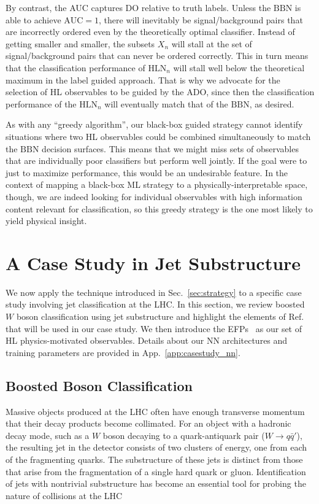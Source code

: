\documentclass[aps,prd,twocolumn,superscriptaddress,preprintnumbers,nofootinbib,longbibliography,floatfix]{revtex4-1}
\newcommand{\BBN}{\text{BBN}}
\newcommand{\HLN}{\text{HLN}}
\newcommand{\AUC}{\text{AUC}}
\newcommand{\rref}[1]{Ref.~\cite{#1}}
\newcommand{\Sec}[1]{Sec.~\ref{#1}}
\newcommand{\App}[1]{App.~\ref{#1}}
\begin{document}
By contrast, the AUC captures DO relative to truth labels. Unless the $\BBN$ is able to achieve $\AUC = 1$, there will inevitably be signal/background pairs that are incorrectly ordered even by the theoretically optimal classifier. Instead of getting smaller and smaller, the subsets $X_{n}$ will stall at the set of signal/background pairs that can never be ordered correctly. This in turn means that the classification performance of $\HLN_{n}$ will stall well below the theoretical maximum in the label guided approach. That is why we advocate for the selection of HL observables to be guided by the ADO, since then the classification performance of the $\HLN_{n}$ will eventually match that of the $\BBN$, as desired.

As with any ``greedy algorithm'', our black-box guided strategy cannot identify situations where two HL observables could be combined simultaneously to match the $\BBN$ decision surfaces. This means that we might miss sets of observables that are individually poor classifiers but perform well jointly. If the goal were to just to maximize performance, this would be an undesirable feature. In the context of mapping a black-box ML strategy to a physically-interpretable space, though, we are indeed looking for individual observables with high information content relevant for classification, so this greedy strategy is the one most likely to yield physical insight. 

\section{A Case Study in Jet Substructure}
\label{sec:casestudy}
We now apply the  technique introduced in \Sec{sec:strategy} to a specific case study involving jet classification at the LHC. In this section, we review boosted $W$ boson classification using jet substructure and highlight the elements of \rref{Baldi:2016fql} that will be used in our case study. We then introduce the EFPs~\cite{Komiske:2017aww} as our set of HL physics-motivated observables. Details about our NN architectures and training parameters are provided in \App{app:casestudy_nn}.

\subsection{Boosted Boson Classification}
\label{subsec:casestudy_boosted}
Massive objects produced at the LHC often have enough transverse momentum that their decay products become collimated. For an object with a hadronic decay mode, such as a $W$ boson decaying to a quark-antiquark pair ($W\rightarrow q\bar{q}'$), the resulting jet in the detector consists of two clusters of energy, one from each of the fragmenting quarks. The substructure of these jets is distinct from those that arise from the fragmentation of a single hard quark or gluon. Identification of jets with nontrivial substructure has become an essential tool for probing the nature of collisions at the LHC~\cite{Seymour:1991cb,Seymour:1993mx,Butterworth:2002tt,Butterworth:2007ke,Butterworth:2008iy,Abdesselam:2010pt,Altheimer:2012mn,Shelton:2013an,Altheimer:2013yza,Adams:2015hiv,Larkoski:2017jix,Asquith:2018igt,Marzani:2019hun}
\end{document}
